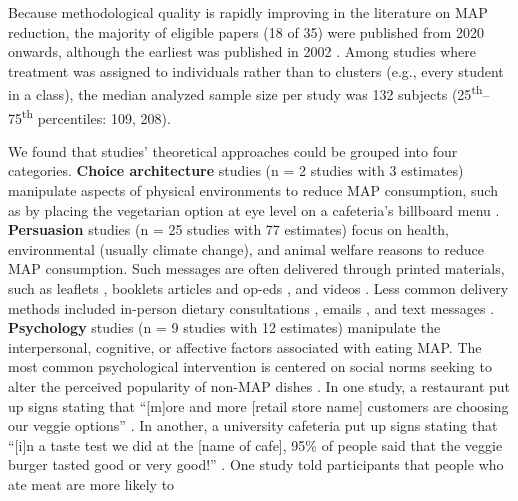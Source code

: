 \documentclass[sn-nature,referee,pdflatex]{sn-jnl}
\begin{document}
Because methodological quality is rapidly improving in the literature on
MAP reduction, the majority of eligible papers (18 of 35) were published
from 2020 onwards, although the earliest was published in 2002
\citep{allen2002}. Among studies where treatment was assigned to
individuals rather than to clusters (e.g., every student in a class),
the median analyzed sample size per study was 132 subjects
(25\textsuperscript{th}--75\textsuperscript{th} percentiles: 109, 208).

We found that studies' theoretical approaches could be grouped into four
categories. \textbf{Choice architecture} studies
\citep{andersson2021, kanchanachitra2020} (n = 2 studies with 3
estimates) manipulate aspects of physical environments to reduce MAP
consumption, such as by placing the vegetarian option at eye level on a
cafeteria's billboard menu \citep{andersson2021}. \textbf{Persuasion}
studies
\citep{kanchanachitra2020, aberman2018, abrahamse2007, acharya2004, banerjee2019, bianchi2022, bochmann2017, bschaden2020, carfora2023, hennessy2016, piester2020, cooney2014, cooney2016, feltz2022, haile2021, hatami2018, jalil2023, mathur2021effectiveness, merrill2009, norris2014, peacock2017, polanco2022, sparkman2021, weingarten2022}
(n = 25 studies with 77 estimates) focus on health, environmental
(usually climate change), and animal welfare reasons to reduce MAP
consumption. Such messages are often delivered through printed
materials, such as leaflets \citep{haile2021, polanco2022}, booklets
\citep{bianchi2022} articles and op-eds \citep{sparkman2021, feltz2022},
and videos \citep{sparkman2021, cooney2016, mathur2021effectiveness}.
Less common delivery methods included in-person dietary consultations
\citep{merrill2009}, emails \citep{banerjee2019}, and text messages
\citep{carfora2023}. \textbf{Psychology} studies
\citep{aldoh2023, allen2002, camp2019, coker2022, piester2020, sparkman2020}
(n = 9 studies with 12 estimates) manipulate the interpersonal,
cognitive, or affective factors associated with eating MAP. The most
common psychological intervention is centered on social norms seeking to
alter the perceived popularity of non-MAP dishes
\citep{sparkman2020, sparkman2021}. In one study, a restaurant put up
signs stating that ``{[}m{]}ore and more {[}retail store name{]}
customers are choosing our veggie options'' \citep{coker2022}. In
another, a university cafeteria put up signs stating that ``{[}i{]}n a
taste test we did at the {[}name of cafe{]}, 95\% of people said that
the veggie burger tasted good or very good!'' \citep{piester2020}. One
study told participants that people who ate meat are more likely to
\end{document}
